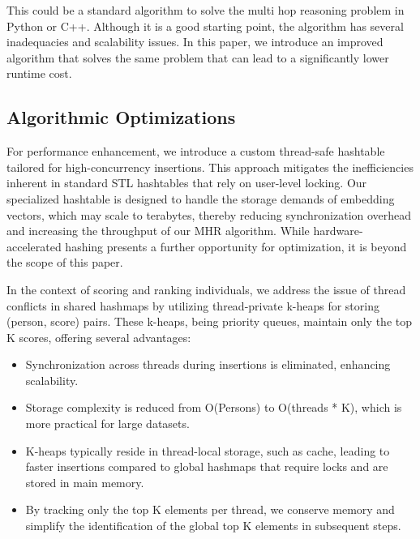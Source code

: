 \documentclass[sigconf]{acmart}
\begin{document}
This could be a standard algorithm to solve the multi hop reasoning problem in Python or C++. Although it is a good starting point, the algorithm has several inadequacies and scalability issues. In this paper, we introduce an improved algorithm that solves the same problem that can lead to a significantly lower runtime cost.

\subsection{Algorithmic Optimizations}

For performance enhancement, we introduce a custom thread-safe hashtable tailored for high-concurrency insertions. This approach mitigates the inefficiencies inherent in standard STL hashtables that rely on user-level locking. Our specialized hashtable is designed to handle the storage demands of embedding vectors, which may scale to terabytes, thereby reducing synchronization overhead and increasing the throughput of our MHR algorithm. While hardware-accelerated hashing presents a further opportunity for optimization, it is beyond the scope of this paper.

In the context of scoring and ranking individuals, we address the issue of thread conflicts in shared hashmaps by utilizing thread-private k-heaps for storing (person, score) pairs. These k-heaps, being priority queues, maintain only the top K scores, offering several advantages:

\begin{itemize} \item Synchronization across threads during insertions is eliminated, enhancing scalability. \item Storage complexity is reduced from O(Persons) to O(threads * K), which is more practical for large datasets. \item K-heaps typically reside in thread-local storage, such as cache, leading to faster insertions compared to global hashmaps that require locks and are stored in main memory. \item By tracking only the top K elements per thread, we conserve memory and simplify the identification of the global top K elements in subsequent steps. \end{itemize}
\end{document}
